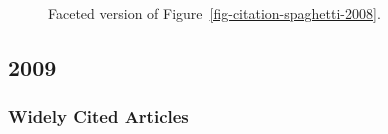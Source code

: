 \documentclass[
  10pt,
  letterpaper,
  DIV=11,
  numbers=noendperiod,
  twoside]{scrartcl}
\begin{document}
\begin{figure}


\caption{\label{fig-citation-facet-2008}Faceted version of
Figure~\ref{fig-citation-spaghetti-2008}.}

\end{figure}%

\newpage

\subsection{2009}\label{sec-s2009}

\subsubsection*{Widely Cited Articles}\label{widely-cited-articles-53}
\end{document}
